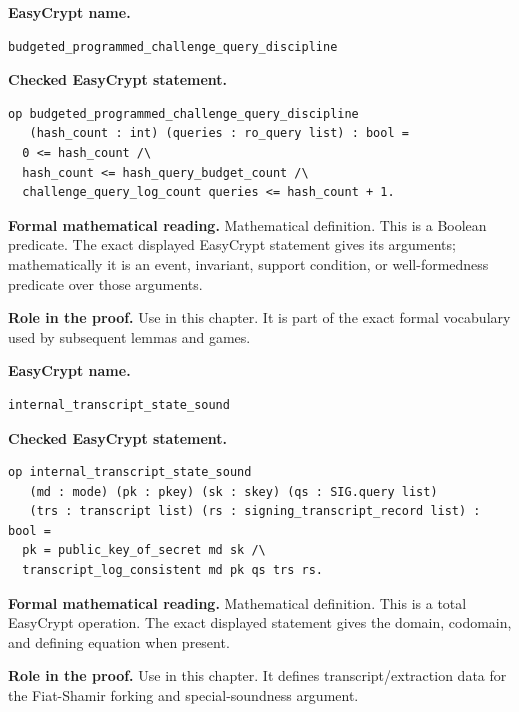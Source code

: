 \begin{formaldefinition}
\noindent\textbf{EasyCrypt name.}
\begin{lstlisting}[language=EasyCrypt,basicstyle=\ttfamily\scriptsize]
budgeted_programmed_challenge_query_discipline
\end{lstlisting}
\noindent\textbf{Checked EasyCrypt statement.}
\begin{lstlisting}[language=EasyCrypt,basicstyle=\ttfamily\scriptsize]
op budgeted_programmed_challenge_query_discipline
   (hash_count : int) (queries : ro_query list) : bool =
  0 <= hash_count /\
  hash_count <= hash_query_budget_count /\
  challenge_query_log_count queries <= hash_count + 1.
\end{lstlisting}
\noindent\textbf{Formal mathematical reading.}
Mathematical definition. This is a Boolean predicate.  The exact displayed EasyCrypt statement gives its arguments; mathematically it is an event, invariant, support condition, or well-formedness predicate over those arguments.

\noindent\textbf{Role in the proof.}
Use in this chapter. It is part of the exact formal vocabulary used by subsequent lemmas and games.

\end{formaldefinition}

\begin{formaldefinition}
\noindent\textbf{EasyCrypt name.}
\begin{lstlisting}[language=EasyCrypt,basicstyle=\ttfamily\scriptsize]
internal_transcript_state_sound
\end{lstlisting}
\noindent\textbf{Checked EasyCrypt statement.}
\begin{lstlisting}[language=EasyCrypt,basicstyle=\ttfamily\scriptsize]
op internal_transcript_state_sound
   (md : mode) (pk : pkey) (sk : skey) (qs : SIG.query list)
   (trs : transcript list) (rs : signing_transcript_record list) : bool =
  pk = public_key_of_secret md sk /\
  transcript_log_consistent md pk qs trs rs.
\end{lstlisting}
\noindent\textbf{Formal mathematical reading.}
Mathematical definition. This is a total EasyCrypt operation.  The exact displayed statement gives the domain, codomain, and defining equation when present.

\noindent\textbf{Role in the proof.}
Use in this chapter. It defines transcript/extraction data for the Fiat-Shamir forking and special-soundness argument.

\end{formaldefinition}

